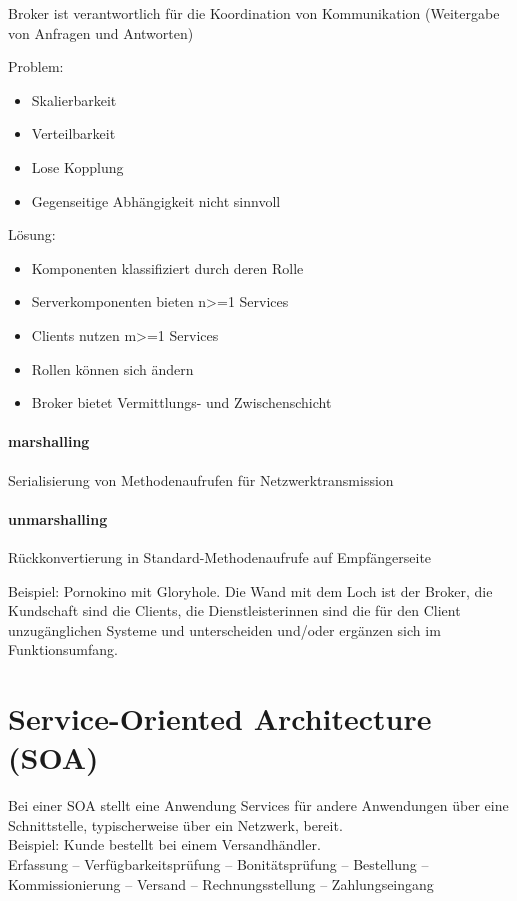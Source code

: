 Broker ist verantwortlich für die Koordination von Kommunikation
(Weitergabe von Anfragen und Antworten)

Problem:

\begin{itemize}
\itemsep1pt\parskip0pt
\item
  Skalierbarkeit
\item
  Verteilbarkeit
\item
  Lose Kopplung
\item
  Gegenseitige Abhängigkeit nicht sinnvoll
\end{itemize}

Lösung:

\begin{itemize}
\itemsep1pt\parskip0pt
\item
  Komponenten klassifiziert durch deren Rolle
\item
  Serverkomponenten bieten n\textgreater{}=1 Services
\item
  Clients nutzen m\textgreater{}=1 Services
\item
  Rollen können sich ändern
\item
  Broker bietet Vermittlungs- und Zwischenschicht
\end{itemize}

\paragraph{marshalling}\label{marshalling}

Serialisierung von Methodenaufrufen für Netzwerktransmission

\paragraph{unmarshalling}\label{unmarshalling}

Rückkonvertierung in Standard-Methodenaufrufe auf Empfängerseite

Beispiel: Pornokino mit Gloryhole. Die Wand mit dem Loch ist der Broker,
die Kundschaft sind die Clients, die Dienstleisterinnen sind die für den
Client unzugänglichen Systeme und unterscheiden und/oder ergänzen sich
im Funktionsumfang.

\section{Service-Oriented Architecture
(SOA)}\label{service-oriented-architecture-soa}
Bei einer SOA stellt eine Anwendung Services für andere Anwendungen über eine
Schnittstelle, typischerweise über ein Netzwerk, bereit.\\
Beispiel: Kunde bestellt bei einem Versandhändler.\\
Erfassung $–$ Verfügbarkeitsprüfung $–$ Bonitätsprüfung $–$ Bestellung $–$\\
Kommissionierung $–$ Versand $–$ Rechnungsstellung $–$ Zahlungseingang

